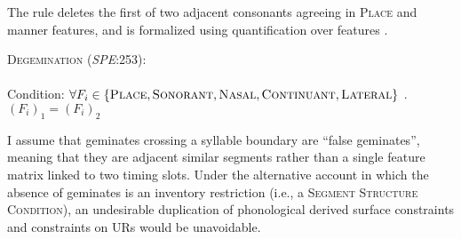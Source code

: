 
The rule deletes the first of two adjacent consonants agreeing in \textsc{Place} and manner features, and is formalized using quantification over features \citep{Reiss2003b}.

\ex \textsc{Degemination} (\emph{SPE}:253): \\
\label{degem}
\\ 
Condition: $\forall F_i \in \{\textsc{Place}, \textsc{Sonorant}, \textsc{Nasal}, \textsc{Continuant}, \textsc{Lateral}\}$ . $(F_i)_1 = (F_i)_2$
\xe

\noindent
I assume that geminates crossing a syllable boundary are ``false geminates'', meaning that they are adjacent similar segments rather than a single feature matrix linked to two timing slots. Under the alternative account in which the absence of geminates is an inventory restriction (i.e., a \textsc{Segment Structure Condition}), an undesirable duplication of phonological derived surface constraints and constraints on URs would be unavoidable.

